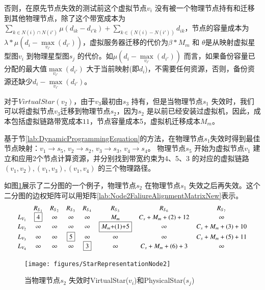 否则，在原先节点失效的测试前这个虚拟节点$v_i$ 没有被一个物理节点持有和迁移到其他物理节点，除了这个带宽成本为${\sum\limits_{k \in N(i) \cap N(i')} {\mu({d_{ik}} - {d_{i'k}})}  + \sum\limits_{k \in \left( {N(i) - N(i')} \right)} {{d_{ik}}} }$，节点的容量成本为${\lambda * \mu({d_i} - \mathop {\max }\limits_{{v_{i'}}} \left( {{d_{i'}}} \right))}$，虚拟服务器迁移的代价为${\beta * {M_m}}$ 和 $\theta$是从映射虚拟星型图$v_i$ 到物理星型图$s_j$ 的代价。如${\mu({d_i} - \mathop {\max }\limits_{{v_{i'}}} \left( {{d_{i'}}} \right))}$ 而言，如果备份容量已分配的最大值${\mathop {\max }\limits_{{v_{i'}}} \left( {{d_{i'}}} \right)}$ 大于当前映射(即$d_i$)，不需要任何资源，否则，备份资源还缺少${{d_i} - \mathop {\max }\limits_{{v_{i'}}} \left( {{d_{i'}}} \right)}$。

对于$VirtualStar(v_2)$，由于$v_3$最初由$s_3$ 持有，但是当物理节点$s_1$ 失效时，我们可以将虚拟节点$v_3$迁移到物理节点$s_2$，因为$s_2$ 是以前已经安装过虚拟机，因此，成本包括虚拟链路带宽成本$11$，节点容量成本5，虚拟机迁移成本$M_m$。

基于节\ref{lab:DynamicProgrammingEquation}的方法，在物理节点$s_1$失效时得到最佳节点映射：$v_1 \rightarrow s_5$, $v_2 \rightarrow s_2$, $v_3 \rightarrow s_3$, $v_4 \rightarrow s_4$。 物理节点$s_5$ 开始为虚拟节点$v_1$ 建立和应用2个节点计算资源，并分别找到带宽约束为4、5、3 的对应的虚拟链路$(v_1,v_2),(v_1,v_3),(v_1,v_4)$ 的三个物理路径。

如图\ref{fig:StarRepresentationNode2}展示了二分图的一个例子，物理节点$s_2$ 在物理节点$s_1$ 失效之后再失效。这个二分图的边权矩阵可以用矩阵\ref{lab:Node2FaliureAlignmentMatrixNew}表示。
\begin{equation}
\small{
 {\begin{array}{*{20}{c}}
&R_{S_{1}}&R_{S_{2}}&R_{S_3}&R_{S_4}&R_{S_5}&R_{S_6}&R_{S_{7}}\\
{L_{V_1}}&\fbox{4}&\infty&\infty&\infty&M_{m}&C_{s}+M_{m}+(2)+12&\infty\\
L_{V_2}&\infty&\infty&\infty&\infty&\fbox{$M_{m}$+(1)+5}&\infty&C_{s}+M_{m}+(3)+10\\
L_{V_3}&\infty&\infty&\fbox{5}&\infty&\infty&\infty&C_{s}+M_{m}+(5)+11\\
L_{V_4}&\infty&\infty&\infty&\fbox{3}&\infty&C_{s}+M_{m}+(6)+3&\infty\\
\end{array}}
}
\label{lab:Node2FaliureAlignmentMatrixNew}
\end{equation}

\begin{figure}[htbp]
\centering
\texttt{[image: figures/StarRepresentationNode2]}\\
  \caption{当物理节点$s_2$ 失效时VirtualStar($v_i$)和PhysicalStar($s_j$)}\label{fig:StarRepresentationNode2}
\end{figure}

